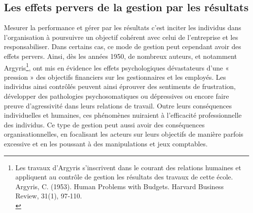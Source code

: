 \documentclass{tufte-handout}
\begin{document}
\subsection{Les effets pervers de la gestion par les résultats}
\label{sec:orgd408b6c}
Mesurer la performance et gérer par les résultats c’est inciter les individus dans l’organisation à poursuivre un objectif cohérent avec celui de l’entreprise et les responsabiliser. Dans certains cas, ce mode de gestion peut cependant avoir des effets pervers. Ainsi, dès les années 1950, de nombreux auteurs, et notamment Argyris\footnote{Les travaux d’Argyris s’inscrivent dans le courant des relations humaines et appliquent au contrôle de gestion les résultats des travaux de cette école. Argyris, C. (1953). Human Problems with Budgets. Harvard Business Review, 31(1), 97‑110.\\}, ont mis en évidence les effets psychologiques dévastateurs d’une « pression » des objectifs financiers sur les gestionnaires et les employés. Les individus ainsi contrôlés peuvent ainsi éprouver des sentiments de frustration, développer des pathologies psychosomatiques ou dépressives ou encore faire preuve d’agressivité dans leurs relations de travail. Outre leurs conséquences individuelles et humaines, ces phénomènes nuiraient à l’efficacité professionnelle des individus. Ce type de gestion peut aussi avoir des conséquences organisationnelles, en focalisant les acteurs sur leurs objectifs de manière parfois excessive et en les poussant à des manipulations et jeux comptables.\\
\end{document}
